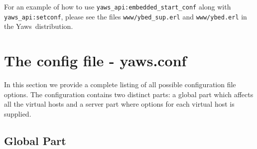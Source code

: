 \documentclass[11pt,oneside,english]{book}
\newcommand{\Yaws}            %
        {{\sc Yaws}}
\begin{document}
For an example of how to use \verb+yaws_api:embedded_start_conf+ along
with \verb+yaws_api:setconf+, please see the files
\verb+www/ybed_sup.erl+ and \verb+www/ybed.erl+ in the
\Yaws\  distribution.

\chapter{The config file - yaws.conf}

In this section we provide a complete listing of all possible
configuration file options.  The configuration contains two distinct
parts: a global part which affects all the virtual hosts and a server
part where options for each virtual host is supplied.

\section{Global Part}
\end{document}
